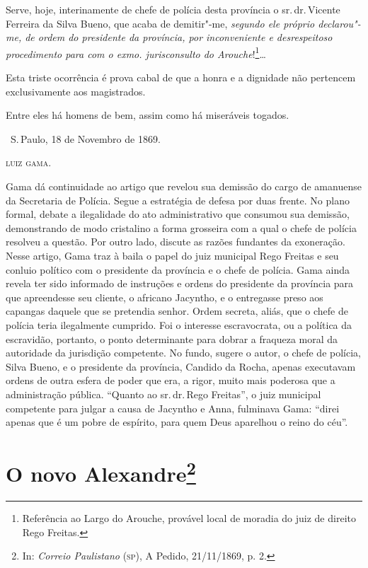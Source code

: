 Serve, hoje, interinamente de chefe de polícia desta província o sr.\,dr.\,Vicente Ferreira da Silva Bueno, que acaba de demitir"-me, \emph{segundo
ele próprio declarou"-me, de ordem do presidente da província, por
inconveniente e desrespeitoso procedimento para com o exmo.
jurisconsulto do Arouche}!\footnote{Referência ao Largo do Arouche,
  provável local de moradia do juiz de direito Rego Freitas.}\ldots{}

Esta triste ocorrência é
prova cabal de que a honra e a dignidade não pertencem exclusivamente
aos magistrados.

Entre eles há homens de bem, assim como há miseráveis togados.

\medskip

\hfill\ S.\,Paulo, 18 de Novembro de 1869.\smallskip

\hfill\textsc{luiz gama.}

\pagebreak
\mbox{}\vfill
\thispagestyle{empty}

{\small\noindent
Gama dá continuidade ao artigo que revelou sua demissão do cargo
de amanuense da Secretaria de Polícia. Segue a estratégia de defesa por
duas frente. No plano formal, debate a ilegalidade do ato administrativo
que consumou sua demissão, demonstrando de modo cristalino a forma
grosseira com a qual o chefe de polícia resolveu a questão. Por outro
lado, discute as razões fundantes da exoneração. Nesse artigo, Gama traz
à baila o papel do juiz municipal Rego Freitas e seu conluio político
com o presidente da província e o chefe de
polícia. Gama ainda revela ter sido informado de instruções e ordens do
presidente da província para que apreendesse seu cliente, o africano
Jacyntho, e o entregasse preso aos capangas daquele que se pretendia
senhor. Ordem secreta, aliás, que o chefe de polícia teria ilegalmente
cumprido. Foi o interesse escravocrata, ou a política da escravidão,
portanto, o ponto determinante para dobrar a fraqueza
moral da autoridade da
jurisdição competente. No fundo, sugere o autor, o chefe de polícia,
Silva Bueno, e o presidente da província, Candido da Rocha, apenas
executavam ordens de outra esfera de poder que era, a rigor, muito mais
poderosa que a administração pública. ``Quanto ao sr.\,dr.\,Rego Freitas'',
o juiz municipal competente para julgar a causa de Jacyntho e Anna,
fulminava Gama: ``direi apenas que é um pobre de espírito, para quem Deus
aparelhou o reino do céu''. }

\chapter{O novo Alexandre\footnote[*]{In: \emph{Correio Paulistano}
  (\textsc{sp}), A Pedido, 21/11/1869, p. 2.}}

